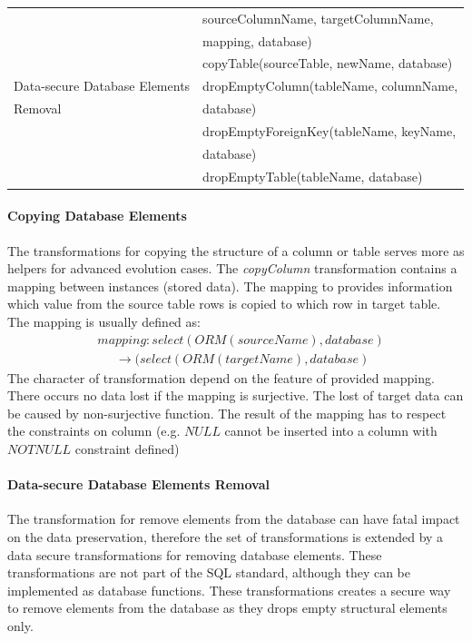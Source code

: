 \documentclass[runningheads]{comsis}
\begin{document}
\begin{table}
\begin{tabular}{ll}
	& \hspace{0.5in} sourceColumnName, targetColumnName, \\ 
	& \hspace{0.5in} mapping, database) \\
	& copyTable(sourceTable, newName, database) \\
	Data-secure Database Elements &
	dropEmptyColumn(tableName, columnName, \\
	Removal & \hspace{0.25in} database) \\
	& dropEmptyForeignKey(tableName, keyName, \\ & \hspace{0.25in} database) \\
	& dropEmptyTable(tableName, database) \\
	\hline
	\end{tabular}
\end{table}


\paragraph{Copying Database Elements}The transformations for copying the structure of a column or table serves more as helpers for advanced evolution cases. The \emph{copyColumn} transformation contains a mapping between instances (stored data). The mapping to provides information which value from the source table rows is copied to which row in target table. The mapping is usually defined as: 
\begin{align}
&	mapping : select(ORM(sourceName), database) \nonumber \\ 
& \;\;\;\;\; \rightarrow  (select(ORM(targetName), database) 
\end{align}
The character of transformation depend on the feature of provided mapping. There occurs no data lost if the mapping is surjective. The lost of target data can be caused by non-surjective function. The result of the mapping has to respect the constraints on column (e.g. $NULL$ cannot be inserted into a column with $NOTNULL$ constraint defined)

\paragraph{Data-secure Database Elements Removal} The transformation for remove elements from the database can have fatal impact on the data preservation, therefore the set of transformations is extended by a data secure transformations for removing database elements. These transformations are not part of the SQL standard, although they can be implemented as database functions. These transformations creates a secure way to remove elements from the database as they drops empty structural elements only. 
\end{document}
